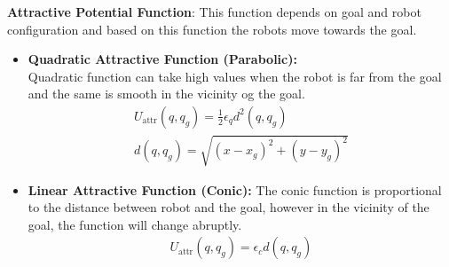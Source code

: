 \noindent \textbf {Attractive Potential Function}: This function depends on goal and robot configuration and based on this function the robots move towards the goal.
\\

\begin{itemize}
    \item  \textbf{ Quadratic Attractive Function (Parabolic): }\\
Quadratic function can take high values when the robot is far from the goal and the same is smooth in the vicinity og the goal.  
\begin{equation}
\begin{aligned}
U_{\text{attr}}(q, q_g) = \frac{1}{2} \epsilon_q d^2(q, q_g) \\
d(q, q_g) = \sqrt{(x - x_g)^2 + (y - y_g)^2}
\end{aligned}
\label{eqn:Quadratic Attractive Function}
\end{equation}  

     \item  \textbf{ Linear Attractive Function (Conic): }
The conic function is proportional to the distance between robot and the goal, however in the vicinity of the goal, the function will change abruptly.  
\begin{equation}
\begin{aligned}
U_{\text{attr}}(q, q_g) = \epsilon_c d(q, q_g)
\end{aligned}
\label{eqn: Linear Attractive Function}
\end{equation}  
\end{itemize}
